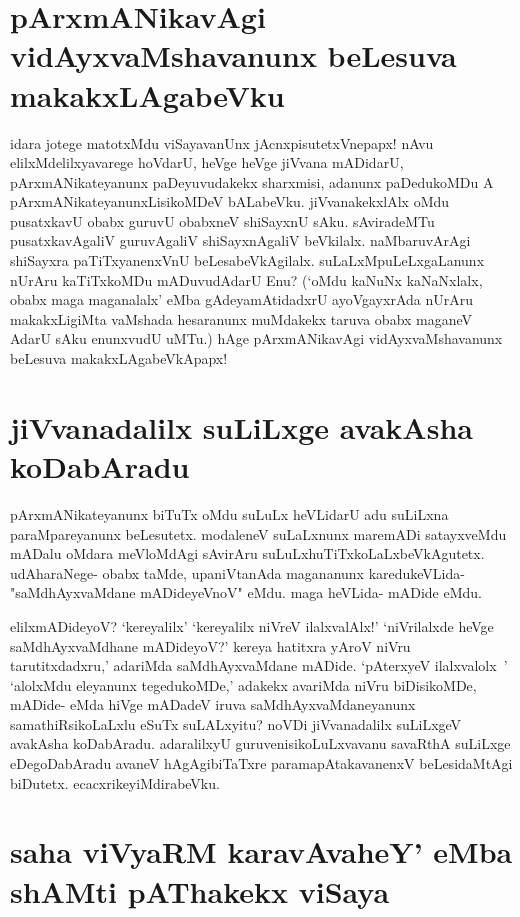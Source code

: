 \section*{pArxmANikavAgi vidAyxvaMshavanunx beLesuva makakxLAgabeVku}

idara jotege matotxMdu viSayavanUnx jAcnxpisutetxVnepapx! nAvu elilxMdelilxyavarege hoVdarU, heVge heVge jiVvana mADidarU, pArxmANikateyanunx paDeyuvudakekx sharxmisi, adanunx paDedukoMDu A pArxmANikateyanunxLisikoMDeV bALabeVku. jiVvanakekxlAlx oMdu pusatxkavU obabx guruvU obabxneV shiSayxnU sAku. sAviradeMTu pusatxkavAgaliV guruvAgaliV shiSayxnAgaliV beVkilalx. naMbaruvArAgi shiSayxra paTiTxyanenxVnU beLesabeVkAgilalx. suLaLxMpuLeLxgaLanunx nUrAru kaTiTxkoMDu mADuvudAdarU Enu? (`oMdu kaNuNx kaNaNxlalx, obabx maga maganalalx' eMba gAdeyamAtidadxrU ayoVgayxrAda nUrAru makakxLigiMta vaMshada hesaranunx muMdakekx taruva obabx maganeV AdarU sAku enunxvudU uMTu.) hAge pArxmANikavAgi vidAyxvaMshavanunx beLesuva makakxLAgabeVkApapx!

\section*{jiVvanadalilx suLiLxge avakAsha koDabAradu}

pArxmANikateyanunx biTuTx oMdu suLuLx heVLidarU adu suLiLxna paraMpareyanunx beLesutetx. modaleneV suLaLxnunx maremADi satayxveMdu mADalu oMdara meVloMdAgi sAvirAru suLuLxhuTiTxkoLaLxbeVkAgutetx. udAharaNege- obabx taMde, upaniVtanAda magananunx karedukeVLida- "saMdhAyxvaMdane mADideyeVnoV" eMdu. maga heVLida- mADide eMdu. 

elilxmADideyoV? `kereyalilx' `kereyalilx niVreV ilalxvalAlx!' `niVrilalxde heVge saMdhAyxvaMdhane mADideyoV?' kereya hatitxra yAroV niVru tarutitxdadxru,' adariMda saMdhAyxvaMdane mADide. `pAterxyeV ilalxvalolx~' `alolxMdu eleyanunx tegedukoMDe,' adakekx avariMda niVru biDisikoMDe, mADide- eMda hiVge mADadeV iruva saMdhAyxvaMdaneyanunx samathiRsikoLaLxlu eSuTx suLALxyitu? noVDi jiVvanadalilx suLiLxgeV avakAsha koDabAradu. adaralilxyU guruvenisikoLuLxvavanu savaRthA suLiLxge eDegoDabAradu avaneV hAgAgibiTaTxre paramapAtakavanenxV beLesidaMtAgi biDutetx. ecacxrikeyiMdirabeVku.

\section*{saha viVyaRM karavAvaheY' eMba shAMti pAThakekx viSaya}
\label{130b}

